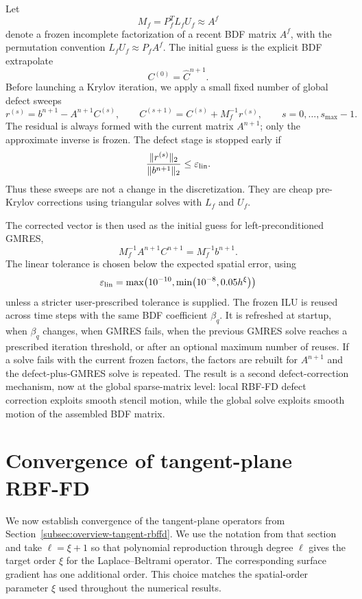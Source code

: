 \documentclass[a4paper,fleqn]{cas-sc}
\begin{document}
Let
\[
  M_f=P_f^TL_fU_f\approx A^f
\]
denote a frozen incomplete factorization of a recent BDF matrix \(A^f\), with
the permutation convention \(L_fU_f\approx P_fA^f\).  The initial guess is the
explicit BDF extrapolate
\[
  C^{(0)}=\widehat C^{n+1}.
\]
Before launching a Krylov iteration, we apply a small fixed number of global
defect sweeps
\begin{equation}
  r^{(s)}=b^{n+1}-A^{n+1}C^{(s)},\qquad
  C^{(s+1)}
  =
  C^{(s)}+M_f^{-1}r^{(s)},
  \qquad s=0,\ldots,s_{\max}-1.
  \label{eq:global-defect-sweep}
\end{equation}
The residual is always formed with the current matrix \(A^{n+1}\); only the
approximate inverse is frozen.  The defect stage is stopped early if
\[
  \frac{\|r^{(s)}\|_2}{\|b^{n+1}\|_2}
  \leq \varepsilon_{\rm lin}.
\]
Thus these sweeps are not a change in the discretization.  They are cheap
pre-Krylov corrections using triangular solves with \(L_f\) and \(U_f\).

The corrected vector is then used as the initial guess for left-preconditioned
GMRES,
\begin{equation}
  M_f^{-1}A^{n+1}C^{n+1}
  =
  M_f^{-1}b^{n+1}.
  \label{eq:frozen-ilu-gmres}
\end{equation}
The linear tolerance is chosen below the expected spatial error, using
\[
  \varepsilon_{\rm lin}
  =
  \max\!\left(10^{-10},\min\!\left(10^{-8},0.05h^\xi\right)\right)
\]
unless a stricter user-prescribed tolerance is supplied.  The frozen ILU is
reused across time steps with the same BDF coefficient \(\beta_q\).  It is
refreshed at startup, when \(\beta_q\) changes, when GMRES fails, when the
previous GMRES solve reaches a prescribed iteration threshold, or after an
optional maximum number of reuses.  If a solve fails with the current frozen
factors, the factors are rebuilt for \(A^{n+1}\) and the defect-plus-GMRES
solve is repeated.  The result is a second defect-correction mechanism, now
at the global sparse-matrix level: local RBF-FD defect correction exploits
smooth stencil motion, while the global solve exploits smooth motion of the
assembled BDF matrix.

\section{Convergence of tangent-plane RBF-FD}
\label{sec:tangent-plane-error-estimates}

We now establish convergence of the tangent-plane operators from
Section~\ref{subsec:overview-tangent-rbffd}.  We use the notation from that
section and take $\ell=\xi+1$
so that polynomial reproduction through degree \(\ell\) gives the target
order \(\xi\) for the Laplace--Beltrami operator.  The corresponding surface
gradient has one additional order.  This choice matches the spatial-order
parameter \(\xi\) used throughout the numerical results.
\end{document}
